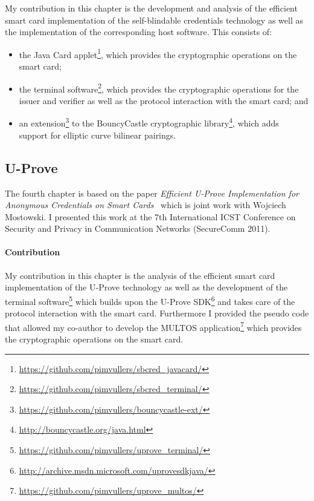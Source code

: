 My contribution in this chapter is the development and analysis of the efficient
smart card implementation of the self-blindable credentials technology as well
as the implementation of the corresponding host software. This consists of:
\begin{itemize}
  \item the Java Card applet\footnote{\url{https://github.com/pimvullers/sbcred_javacard/}},
    which provides the cryptographic operations on the smart card;
  \item the terminal software\footnote{\url{https://github.com/pimvullers/sbcred_terminal/}},
    which provides the cryptographic operations for the issuer and verifier as
    well as the protocol interaction with the smart card; and
  \item an extension\footnote{\url{https://github.com/pimvullers/bouncycastle-ext/}}
    to the BouncyCastle cryptographic library\footnote{\url{http://bouncycastle.org/java.html}},
    which adds support for elliptic curve bilinear pairings.
\end{itemize}

\subsection{U-Prove}

The fourth chapter is based on the paper \emph{Efficient U-Prove Implementation
for Anonymous Credentials on Smart Cards}~\cite{MostowskiVullers11} which is
joint work with Wojciech Mostowski. I presented this work at the 7th
International ICST Conference on Security and Privacy in Communication Networks
(SecureComm 2011).

\paragraph{Contribution}

My contribution in this chapter is the analysis of the efficient smart card
implementation of the U-Prove technology as well as the development of the
terminal software\footnote{\url{https://github.com/pimvullers/uprove_terminal/}}
which builds upon the U-Prove SDK\footnote{\url{http://archive.msdn.microsoft.com/uprovesdkjava/}}
and takes care of the protocol interaction with the smart card. Furthermore I
provided the pseudo code that allowed my co-author to develop the MULTOS
application\footnote{\url{https://github.com/pimvullers/uprove_multos/}} which
provides the cryptographic operations on the smart card.

